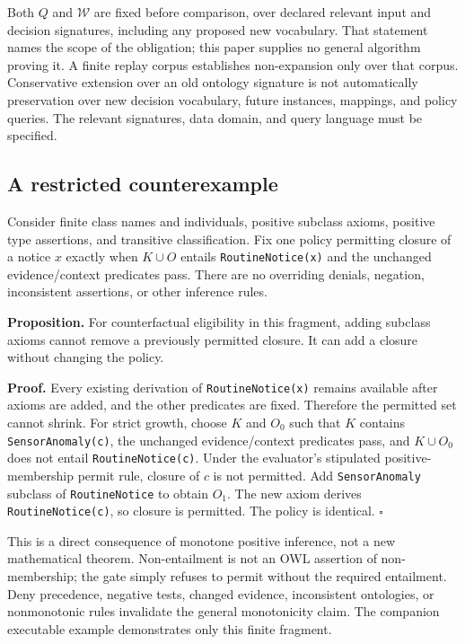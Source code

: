 \documentclass[
  english,
  12pt,
  a4paper,
  preprint,
  numbers,
  nopreprintline]{elsarticle}
\begin{document}
Both \(Q\) and \(\mathcal{W}\) are fixed before comparison, over
declared relevant input and decision signatures, including any proposed
new vocabulary. That statement names the scope of the obligation; this
paper supplies no general algorithm proving it. A finite replay corpus
establishes non-expansion only over that corpus. Conservative extension
over an old ontology signature is not automatically preservation over
new decision vocabulary, future instances, mappings, and policy queries.
The relevant signatures, data domain, and query language must be
specified.

\subsection{A restricted
counterexample}\label{a-restricted-counterexample}

Consider finite class names and individuals, positive subclass axioms,
positive type assertions, and transitive classification. Fix one policy
permitting closure of a notice \(x\) exactly when \(K\cup O\) entails
\texttt{RoutineNotice(x)} and the unchanged evidence/context predicates
pass. There are no overriding denials, negation, inconsistent
assertions, or other inference rules.

\textbf{Proposition.} For counterfactual eligibility in this fragment,
adding subclass axioms cannot remove a previously permitted closure. It
can add a closure without changing the policy.

\textbf{Proof.} Every existing derivation of \texttt{RoutineNotice(x)}
remains available after axioms are added, and the other predicates are
fixed. Therefore the permitted set cannot shrink. For strict growth,
choose \(K\) and \(O_0\) such that \(K\) contains
\texttt{SensorAnomaly(c)}, the unchanged evidence/context predicates
pass, and \(K\cup O_0\) does not entail \texttt{RoutineNotice(c)}. Under
the evaluator's stipulated positive-membership permit rule, closure of
\(c\) is not permitted. Add \texttt{Sensor\allowbreak{}Anomaly} subclass of
\texttt{Routine\allowbreak{}Notice} to obtain \(O_1\). The new axiom derives
\texttt{RoutineNotice(c)}, so closure is permitted. The policy is
identical. \(\square\)

This is a direct consequence of monotone positive inference, not a new
mathematical theorem. Non-entailment is not an OWL assertion of
non-membership; the gate simply refuses to permit without the required
entailment. Deny precedence, negative tests, changed evidence,
inconsistent ontologies, or nonmonotonic rules invalidate the general
monotonicity claim. The companion executable example demonstrates only
this finite fragment.
\end{document}

